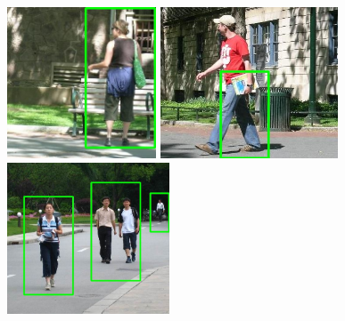 \begin{figure}[H]
\centering
\includegraphics[keepaspectratio, max height=4.5cm,]{figures/ped/d/7}%
\hfill %
\includegraphics[keepaspectratio, max height=4.5cm,]{figures/ped/d/8}%
\hfill %
\includegraphics[keepaspectratio, max height=4.5cm,]{figures/ped/d/9}%
\end{figure}

